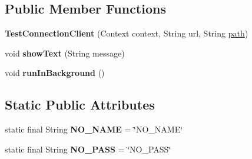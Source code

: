 \subsection*{Public Member Functions}
\begin{DoxyCompactItemize}
\item 
{\bfseries Test\+Connection\+Client} (Context context, String url, String \hyperlink{classcom_1_1example_1_1sebastian_1_1tindertp_1_1internetTools_1_1MediaDownloader_a99ab591fedeaa392762bf534499a2279}{path})\hypertarget{classcom_1_1example_1_1sebastian_1_1tindertp_1_1internetTools_1_1TestConnectionClient_acc2c40dcd03eb9257269a7926767a1c1}{}\label{classcom_1_1example_1_1sebastian_1_1tindertp_1_1internetTools_1_1TestConnectionClient_acc2c40dcd03eb9257269a7926767a1c1}

\item 
void {\bfseries show\+Text} (String message)\hypertarget{classcom_1_1example_1_1sebastian_1_1tindertp_1_1internetTools_1_1TestConnectionClient_a820fe26eac210188c284dc37760017d3}{}\label{classcom_1_1example_1_1sebastian_1_1tindertp_1_1internetTools_1_1TestConnectionClient_a820fe26eac210188c284dc37760017d3}

\item 
void {\bfseries run\+In\+Background} ()\hypertarget{classcom_1_1example_1_1sebastian_1_1tindertp_1_1internetTools_1_1TestConnectionClient_a43f1f6d1cb7a23a3785dc4075996dba2}{}\label{classcom_1_1example_1_1sebastian_1_1tindertp_1_1internetTools_1_1TestConnectionClient_a43f1f6d1cb7a23a3785dc4075996dba2}

\end{DoxyCompactItemize}
\subsection*{Static Public Attributes}
\begin{DoxyCompactItemize}
\item 
static final String {\bfseries N\+O\+\_\+\+N\+A\+ME} = \char`\"{}N\+O\+\_\+\+N\+A\+ME\char`\"{}\hypertarget{classcom_1_1example_1_1sebastian_1_1tindertp_1_1internetTools_1_1TestConnectionClient_a0559c48bdff3944ee82304941fa32991}{}\label{classcom_1_1example_1_1sebastian_1_1tindertp_1_1internetTools_1_1TestConnectionClient_a0559c48bdff3944ee82304941fa32991}

\item 
static final String {\bfseries N\+O\+\_\+\+P\+A\+SS} = \char`\"{}N\+O\+\_\+\+P\+A\+SS\char`\"{}\hypertarget{classcom_1_1example_1_1sebastian_1_1tindertp_1_1internetTools_1_1TestConnectionClient_acf6634f9a5925bac4b09296b67ad92c4}{}\label{classcom_1_1example_1_1sebastian_1_1tindertp_1_1internetTools_1_1TestConnectionClient_acf6634f9a5925bac4b09296b67ad92c4}

\end{DoxyCompactItemize}
